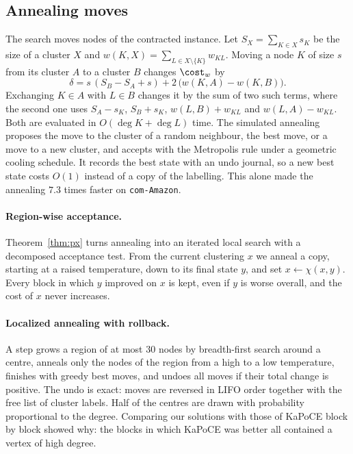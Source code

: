 \subsection{Annealing moves}

The search moves nodes of the contracted instance.  Let $S_X=\sum_{K\in X}s_K$
be the size of a cluster $X$ and $w(K,X)=\sum_{L\in X\setminus\{K\}}w_{KL}$.
Moving a node $K$ of size $s$ from its cluster $A$ to a cluster $B$ changes
$\cost_w$ by
\begin{equation}\label{eq:move}
\delta=s\,(S_B-S_A+s)+2\,\bigl(w(K,A)-w(K,B)\bigr).
\end{equation}
Exchanging $K\in A$ with $L\in B$ changes it by the sum of two such terms,
where the second one uses $S_A-s_K$, $S_B+s_K$, $w(L,B)+w_{KL}$ and
$w(L,A)-w_{KL}$.  Both are evaluated in $O(\deg K+\deg L)$ time.  The
simulated annealing~\citep{KirkpatrickGV83} proposes the move to the cluster
of a random neighbour, the best move, or a move to a new cluster, and accepts
with the Metropolis rule under a geometric cooling schedule.  It records the
best state with an undo journal, so a new best state costs $O(1)$ instead of
a copy of the labelling.  This alone made the annealing $7.3$ times faster on
\texttt{com-Amazon}.

\paragraph{Region-wise acceptance.}  Theorem~\ref{thm:px} turns annealing into
an iterated local search with a decomposed acceptance test.  From the current
clustering $x$ we anneal a copy, starting at a raised temperature, down to its
final state $y$, and set $x\gets\chi(x,y)$.  Every block in which $y$ improved
on $x$ is kept, even if $y$ is worse overall, and the cost of $x$ never
increases.

\paragraph{Localized annealing with rollback.}  A step grows a region of at
most $30$ nodes by breadth-first search around a centre, anneals only the
nodes of the region from a high to a low temperature, finishes with greedy best
moves, and undoes all moves if their total change is positive.  The undo is
exact: moves are reversed in LIFO order together with the free list of
cluster labels.  Half of the centres are drawn with probability proportional to
the degree.  Comparing our solutions with those of KaPoCE block by block showed
why: the blocks in which KaPoCE was better all contained a vertex of high
degree.

